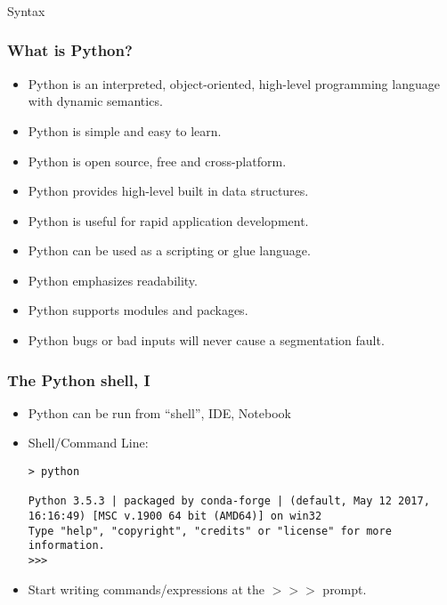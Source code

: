 \begin{frame}[fragile]\frametitle{}
\begin{center}
{\Large Syntax}
\end{center}

\end{frame}
\begin{frame}[fragile]  \frametitle{What is Python?}
\begin{itemize}
\item Python is an interpreted, object-oriented, high-level programming language with dynamic semantics.
\item Python is simple and easy to learn.
\item Python is open source, free and cross-platform.
\item Python provides high-level built in data structures.
\item Python is useful for rapid application development.
\item Python can be used as a scripting or glue language.
\item Python emphasizes readability.
\item Python supports modules and packages.
\item Python bugs or bad inputs will never cause a segmentation fault.
\end{itemize}
\end{frame}

\begin{frame}[fragile]  \frametitle{The Python shell, I}
  \begin{itemize}
  \item Python can be run from ``shell'', IDE, Notebook
 \item Shell/Command Line:
\begin{lstlisting}
> python

Python 3.5.3 | packaged by conda-forge | (default, May 12 2017, 16:16:49) [MSC v.1900 64 bit (AMD64)] on win32
Type "help", "copyright", "credits" or "license" for more information.
>>>
\end{lstlisting}
\item Start writing commands/expressions at the $>>>$ prompt.
\end{itemize}
\end{frame}

